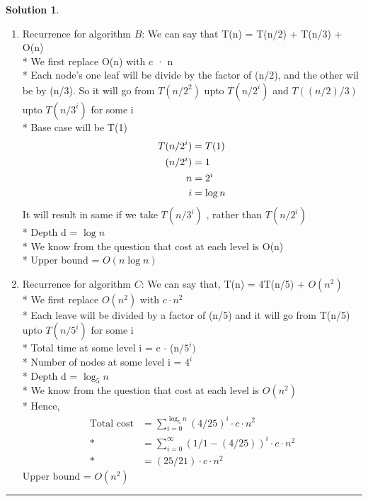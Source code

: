 \documentclass{article}
\theoremstyle{definition}
\def\fline{\rule{0.75\linewidth}{0.5pt}}
\newcommand{\finishline}{\vspace{-15pt}\begin{center}\fline\end{center}}
\newtheorem*{solution*}{Solution}
\newenvironment{solution}{\begin{solution*}}{{\finishline} \end{solution*}}
\begin{document}
\begin{solution}
\begin{enumerate}[label=(\Alph*)]
		\item Recurrence for algorithm $B$:  
		We can say that T(n) = T(n/2) + T(n/3) + O(n)\\*
		We first replace O(n) with c · n  \\*
		Each node's one leaf will be divide by the factor of (n/2), and the other wil be by (n/3). So it will go from $T(n/2^{2})$ upto $T(n/2^{i})$ and $T((n/2)/3)$  upto $T(n/3^{i})$ for some i \\*
		Base case will be T(1) 
		 \begin{align*}
			T(n/2^{i}) &= T(1) \\*
			(n/2^{i}) &= 1 \\*
			n &= 2^{i} \\*
			i &= \log n \bigskip \\*
		\end{align*}
		It will result in same if we take $T(n/3^{i})$ , rather than $T(n/2^{i})$ \\*
		Depth d = $\log n$ \\*
		We know from the question that cost at each level is O(n) \\*
		Upper bound = $O(n\log n)$
		
		\item Recurrence for algorithm $C$:  
		We can say that, T(n) = 4T(n/5) + $O(n^{2})$ \\*
		We first replace $O(n^{2})$ with $c \cdot n^{2}$  \\*
		Each leave will be divided by a factor of (n/5) and it will go from T(n/5) upto $T(n/5^{i})$ for some i \\*
		Total time at some level i = c $\cdot$ (n/$5^{i})$ \\*
		Number of nodes at some level i = $4^{i}$\\*
		Depth d = $\log_5 n$ \\*
		We know from the question that cost at each level is $O(n^{2})$ \\*
		Hence, 
		 \begin{align*}
			{\text{Total cost}} &=  \sum_{i=0}^{\log_5 n} (4/25)^{i}\cdot c\cdot n^{2} \\*
					          &= \sum_{i=0}^{\infty} (1/1-(4/25))^{i}\cdot c\cdot n^{2} \\*
					          &= (25/21) \cdot c \cdot n^{2}
		 \end{align*}
		Upper bound = $O(n^{2})$


\end{enumerate}
\end{solution}
\end{document}
